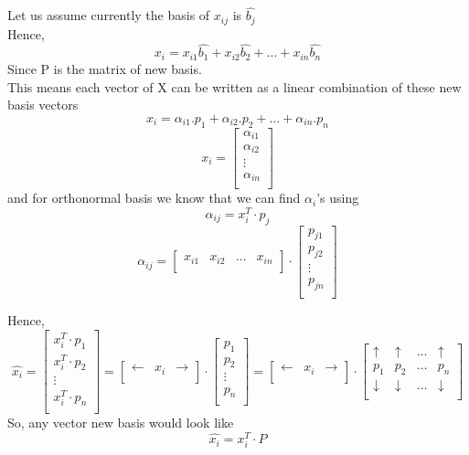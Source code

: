 \documentclass{article}
\begin{document}
Let us assume currently the basis of $x_{ij}$ is $\hat{b_{j}}$\\
Hence,\\
$$
  x_i=x_{i1}\hat{b_1}+x_{i2}\hat{b_2}+\dots+x_{in}\hat{b_n}
$$
Since P is the matrix of new basis.\\
This means each vector of X can be written as a linear combination of these new basis vectors\\
$$
  x_i=\alpha_{i1}.p_1+\alpha_{i2}.p_2+\dots+\alpha_{in}.p_n
$$
$$
  x_i=\begin{bmatrix}
    \alpha_{i1} \\
    \alpha_{i2} \\
    \vdots      \\
    \alpha_{in} \\
  \end{bmatrix}
$$
and for orthonormal basis we know that we can find $\alpha_i$'s using\\
$$
  \alpha_{ij}=x_i^T \cdot p_j
$$
$$
  \alpha_{ij}=\begin{bmatrix}
    x_{i1} &
    x_{i2} &
    \dots  &
    x_{in}\\
  \end{bmatrix} \cdot \begin{bmatrix}
    p_{j1} \\
    p_{j2} \\
    \vdots \\
    p_{jn} \\
  \end{bmatrix}
$$

Hence,\\
$$
  \hat{x_i}=\begin{bmatrix}
    x_i^T \cdot p_1 \\
    x_i^T \cdot p_2 \\
    \vdots          \\
    x_i^T \cdot p_n \\
  \end{bmatrix}=\begin{bmatrix}
    \mathbf{\longleftarrow } & x_i & \mathbf{\longrightarrow} \\
  \end{bmatrix} \cdot \begin{bmatrix}
    p_1    \\
    p_2    \\
    \vdots \\
    p_n    \\
  \end{bmatrix}=\begin{bmatrix}
    \mathbf{\longleftarrow } & x_i & \mathbf{\longrightarrow} \\
  \end{bmatrix} \cdot \begin{bmatrix}
    \uparrow   & \uparrow   & \dots & \uparrow   \\
    p_1        & p_2        & \dots & p_n        \\
    \downarrow & \downarrow & \dots & \downarrow \\
  \end{bmatrix}
$$
So, any vector new basis would look like\\
$$
  \hat{x_i}=x_i^T \cdot P
$$
\end{document}
